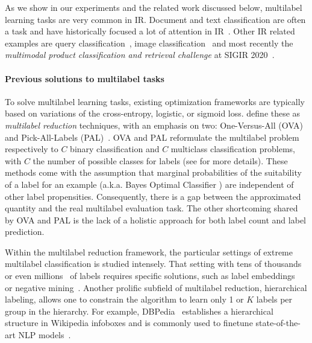 As we show in our experiments and the related work discussed below, multilabel learning tasks are very common in \ac{IR}. Document and text classification are often a  task and have historically focused a lot of attention in \ac{IR}~\cite{IRClassStat, textCategorization, statTextCategorization, documentClassification}. Other \ac{IR} related examples are query classification~\cite{queryClassification, introIR}, image classification~\cite{imageClassification, faceDetection} and most recently the \textit{multimodal product classification and retrieval challenge} at SIGIR 2020~\cite{Amoualian2020SIGIR2E}. 
\fi

\paragraph{Previous solutions to multilabel tasks}
To solve multilabel learning tasks, existing optimization frameworks are typically based on variations of the cross-entropy, logistic, or sigmoid loss. \citeauthor{multilabelReduction} define these as \emph{multilabel reduction} techniques, with an emphasis on two: One-Versus-All (OVA) and Pick-All-Labels (PAL)~\cite{multilabelReduction}. OVA and PAL reformulate the multilabel problem respectively to $C$ binary classification and $C$ multiclass classification problems, with $C$ the number of possible classes for labels (see  for more details). These methods come with the assumption that marginal probabilities of the suitability of a label for an example (a.k.a. Bayes Optimal Classifier ) are independent of other label propensities. Consequently, there is a gap between the approximated quantity and the real multilabel evaluation task. The other shortcoming shared by OVA and PAL is the lack of a holistic approach for both label count and label prediction.

Within the multilabel reduction framework, the particular settings of extreme multilabel classification is studied intensely. That setting with tens of thousands~\cite{extremeClassification} or even millions~\cite{millionsOfLabels, extremeMilliionsSlice} of labels requires specific solutions, such as label embeddings~\cite{extremeMultilabelEmbeddings} or negative mining~\cite{stochasticNegativeMining}. Another prolific subfield of multilabel reduction, hierarchical labeling, allows one to constrain the algorithm to learn only 1 or $K$ labels per group in the hierarchy. For example, DBPedia~\citep{lehmann2015dbpedia} establishes a hierarchical structure in Wikipedia infoboxes and is commonly used to finetune state-of-the-art NLP models~\citep[see, e.g.,][]{XLNet, ULMFit}. 

